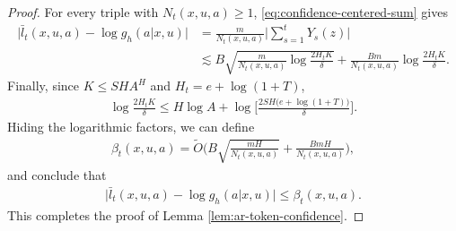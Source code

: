 \documentclass[11pt]{article}
\begin{document}
\begin{proof}
For every triple with $N_t(x,u,a)\geq1$,
\eqref{eq:confidence-centered-sum} gives
\begin{align*}
    \big|
        \bar l_t(x,u,a)-\log g_h(a|x,u)
    \big|
    &=
    \frac{m}{N_t(x,u,a)}
    \bigg|\sum_{s=1}^tY_s(z)\bigg|\\
    &\lesssim
    B\sqrt{
        \frac{m}{N_t(x,u,a)}
        \log\frac{2H_tK}{\delta}
    }
    +
    \frac{Bm}{N_t(x,u,a)}
    \log\frac{2H_tK}{\delta}.
\end{align*}
Finally, since $K\leq SH A^H$ and $H_t=e+\log(1+T)$,
\begin{align*}
    \log\frac{2H_tK}{\delta}
    \leq
    H\log A
    +
    \log\bigg[
        \frac{2SH\bigl(e+\log(1+T)\bigr)}{\delta}
    \bigg].
\end{align*}
Hiding the logarithmic factors, we can define 
\begin{align*}
    \beta_t(x,u,a) = \tilde O\bigg(
        B\sqrt{\frac{mH}{N_t(x,u,a)}}
        +
        \frac{BmH}{N_t(x,u,a)}
    \bigg),
\end{align*}
and conclude that
\begin{align*}
    \big|
        \bar l_t(x,u,a)-\log g_h(a|x,u)
    \big|
    \leq \beta_t(x,u,a).
\end{align*}
This completes the proof of Lemma \ref{lem:ar-token-confidence}.
\end{proof}
\end{document}
